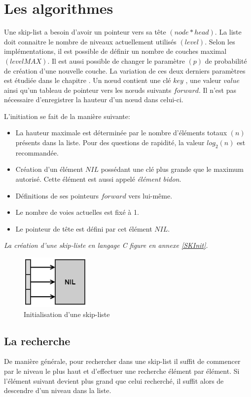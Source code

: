 \documentclass[hidelinks,a4paper, 12pt]{article}
\begin{document}
	\newpage
	\section{Les algorithmes}
	Une skip-list a besoin d'avoir un pointeur vers sa tête $(node* head)$. La liste doit connaitre le nombre de niveaux actuellement utilisés $(level)$. Selon les implémentations, il est possible de définir un nombre de couches maximal $(levelMAX)$. Il est aussi possible de changer le paramètre $(p)$ de probabilité de création d'une nouvelle couche. La variation de ces deux derniers paramètres est étudiée dans le chapitre .
	Un nœud contient une clé $key$ , une valeur $value$ ainsi qu'un tableau de pointeur vers les nœuds suivants $forward$. Il n'est pas nécessaire d'enregistrer la hauteur d'un nœud dans celui-ci.
	
	
	L'initiation se fait de la manière suivante:
	\begin{itemize}
		\item La hauteur maximale est déterminée par le nombre d'éléments totaux $(n)$ présents dans la liste. Pour des questions de rapidité, la valeur $log_2(n)$ est recommandée.
		\item Création d'un élément $NIL$ possédant une clé plus grande que le maximum autorisé. Cette élément est aussi appelé \textit{élément bidon}.
		\item Définitions de ses pointeurs $forward$ vers lui-même.
		\item Le nombre de voies actuelles est fixé à 1.
		\item Le pointeur de tête est défini par cet élément $NIL$.
	\end{itemize}
	\emph{La création d'une skip-liste en langage C figure en annexe \ref{SKInit}.}
	
	\begin{figure}[h]
		\includegraphics{img/init}
		\caption{Initialisation d'une skip-liste}
		\label{SkipInit}
	\end{figure}
	
	\newpage
	\subsection{La recherche}
	De manière générale, pour rechercher dans une skip-list il suffit de commencer par le niveau le plus haut et d'effectuer une recherche élément par élément. Si l'élément suivant devient plus grand que celui recherché, il suffit alors de descendre d'un niveau dans la liste.
	
\end{document}
